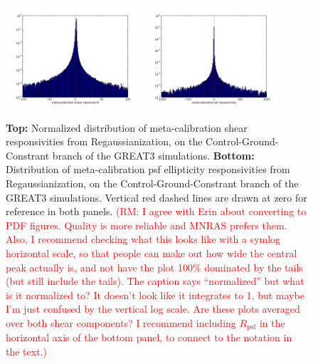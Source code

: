 \documentclass[iop]{emulateapj}
\newcommand\rmcomment[1]{\textcolor{red}{(RM: #1)}}
\begin{document}
\begin{figure}
\includegraphics[width=0.45\textwidth]{./Plots/regauss-r-histogram.png}
\includegraphics[width=0.45\textwidth]{./Plots/regauss-a-histogram.png}
\caption{{\bf Top:} Normalized distribution of meta-calibration shear
  responsivities from Regaussianization, on the
  Control-Ground-Constrant branch of the GREAT3 simulations.  {\bf
    Bottom:} Distribution of meta-calibration psf ellipticity
  responsivities from Regaussianization, on the
  Control-Ground-Constrant branch of the GREAT3 simulations. Vertical
  red dashed lines are drawn at zero for reference in both panels.
\rmcomment{I agree with Erin about converting to PDF figures.  Quality is more reliable and MNRAS
  prefers them.  Also, I recommend checking what this looks like with a symlog horizontal
  scale, so that people can make out how wide the central peak actually is, and not have the plot
  100\% dominated by the tails (but still include the tails).  The caption says ``normalized'' but
  what is it normalized to?  It doesn't look like it integrates to 1, but maybe I'm just confused by
the vertical log scale.  Are these plots averaged over both shear components?  I recommend including
$R_\text{psf}$ in the horizontal axis of the bottom panel, to connect to the notation in the text.}
}
\label{fig:calibhist}
\end{figure}
\end{document}
